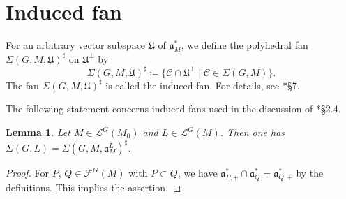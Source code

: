 \documentclass[12pt]{amsart}
\theoremstyle{definition}
\theoremstyle{plain}
\newtheorem{lemma}[definition]{Lemma}
\theoremstyle{remark}
\newcommand{\fa}{\mathfrak{a}}
\newcommand{\cC}{\mathcal{C}}
\newcommand{\cF}{\mathcal{F}}
\newcommand{\cL}{\mathcal{L}}
\numberwithin{equation}{section}
\begin{document}
\section{Induced fan}\label{sec:inducedfan}

For an arbitrary vector subspace $\mathfrak{U}$ of $\fa_M^*$, we define the polyhedral fan $\Sigma(G,M,\mathfrak{U})^\sharp$ on $\mathfrak{U}^\perp$ by
\[
\Sigma(G,M,\mathfrak{U})^\sharp\coloneqq \{ \cC\cap \mathfrak{U}^\perp \mid \cC\in\Sigma(G,M) \}.
\]
The fan $\Sigma(G,M,\mathfrak{U})^\sharp$ is called the induced fan.
For details, see \cite{FL11}*{\S7}.


The following statement concerns induced fans used in the discussion of \cite{FLM11}*{\S2.4}.
\begin{lemma}\label{lem:indfun1}
    Let $M\in\cL^G(M_0)$ and $L\in\cL^G(M)$. 
    Then one has $\Sigma(G,L)=\Sigma(G,M,\fa_M^L)^\sharp$.
\end{lemma}
\begin{proof}
For $P$, $Q\in\cF^G(M)$ with $P\subset Q$, we have $\fa_{P,+}^*\cap \fa_Q^*=\fa_{Q,+}^*$ by the definitions. 
This implies the assertion.
\end{proof}
\end{document}
